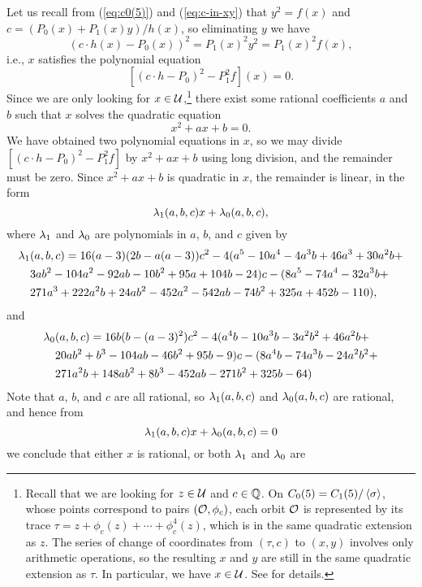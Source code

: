 Let us recall from (\ref{eq:c0(5)}) and (\ref{eq:c-in-xy}) that $y^2 =
f(x)$ and $c = (P_0(x) + P_1(x) y)/h(x)$, so eliminating $y$ we have
\[
(c \cdot h(x) - P_0(x))^2 = P_1(x)^2 y^2 = P_1(x)^2 f(x),
\]
i.e., $x$ satisfies the polynomial equation
\[
[(c \cdot h - P_0)^2 - P_1^2 f](x) = 0.
\]
Since we are only looking for $x \in \mathcal{U}$,\footnote{%
  Recall that we are looking for $z \in \mathcal{U}$ and $c \in \mathbb{Q}$. On $C_0(5)
  = C_1(5) / \left<\sigma\right>$, whose points correspond to pairs $(\mathcal{O},
  \phi_c)$, each orbit $\mathcal{O}$ is represented by its trace $\tau = z +
  \phi_c(z) + \cdots + \phi_c^4(z)$, which is in the same quadratic
  extension as $z$. The series of change of coordinates from $(\tau,
  c)$ to $(x, y)$ involves only arithmetic operations, so the
  resulting $x$ and $y$ are still in the same quadratic extension as
  $\tau$. In particular, we have $x \in \mathcal{U}$. See \cite{MR1480542} for
  details.}
there exist some rational coefficients $a$ and $b$ such that $x$
solves the quadratic equation
\[
x^2 + a x + b = 0.
\]
We have obtained two polynomial equations in $x$, so we may divide
$[(c \cdot h - P_0)^2 - P_1^2 f]$ by $x^2 + ax + b$ using long
division, and the remainder must be zero. Since $x^2 + ax + b$ is
quadratic in $x$, the remainder is linear, in the form
\[
\lambda_1(a, b, c) x + \lambda_0(a, b, c),
\]
where $\lambda_1$ and $\lambda_0$ are polynomials in $a$, $b$, and $c$ given by
\[
\begin{aligned}
  \lambda_1&(a, b, c) = 16 (a - 3) (2b - a(a-3)) c^2 -
  4(a^{5} - 10 a^{4} - 4 a^{3} b + 46 a^{3} + 30 a^{2} b + \\
  & 3 a b^{2} - 104 a^{2} - 92 a b - 10 b^{2} + 95 a + 104 b - 24) c -
  (8 a^{5} - 74 a^{4} - 32 a^{3} b + \\
  & 271 a^{3} + 222 a^{2} b + 24 a b^{2} - 452 a^{2} - 542 a b - 74
  b^{2} + 325 a + 452 b - 110),
\end{aligned}
\]
and
\[
\begin{aligned}
  \lambda_0&(a, b, c) = 16 b (b - (a-3)^2) c^2 -
  4(a^{4} b - 10 a^{3} b - 3 a^{2} b^{2} + 46 a^{2} b + \\
  & 20 a b^{2} + b^{3} - 104 a b - 46 b^{2} + 95 b - 9) c -
  (8 a^{4} b - 74 a^{3} b - 24 a^{2} b^{2} + \\
  & 271 a^{2} b + 148 a b^{2} + 8 b^{3} - 452 a b - 271 b^{2} + 325 b
  - 64)
\end{aligned}
\]
Note that $a$, $b$, and $c$ are all rational, so $\lambda_1(a, b, c)$ and
$\lambda_0(a, b, c)$ are rational, and hence from
\[
\lambda_1(a, b, c) x + \lambda_0(a, b, c) = 0
\]
we conclude that either $x$ is rational, or both $\lambda_1$ and $\lambda_0$ are
